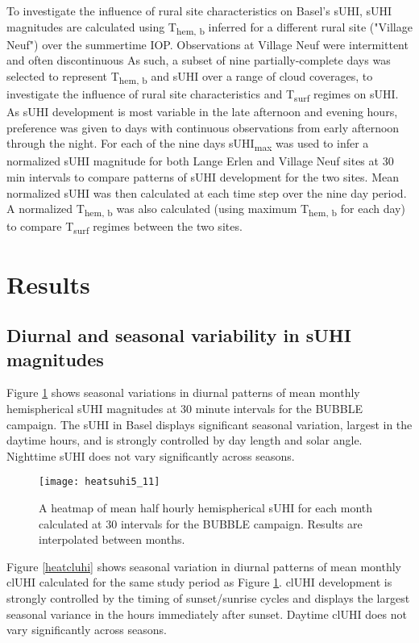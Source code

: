 \begin{bibunit}
To investigate the influence of rural site characteristics on Basel's sUHI, sUHI magnitudes are calculated using T\textsubscript{hem, b} inferred for a different rural site ("Village Neuf") over the summertime IOP. Observations at Village Neuf were intermittent and often discontinuous As such, a subset of nine partially-complete days was selected to represent T\textsubscript{hem, b} and sUHI over a range of cloud coverages, to investigate the influence of rural site characteristics and T\textsubscript{surf} regimes on sUHI. As sUHI development is most variable in the late afternoon and evening hours, preference was given to days with continuous observations from early afternoon through the night. For each of the nine days sUHI\textsubscript{max} was used to infer a normalized sUHI magnitude for both Lange Erlen and Village Neuf sites at 30 \si{\minute} intervals to compare patterns of sUHI development for the two sites. Mean normalized sUHI was then calculated at each time step over the nine day period. A normalized T\textsubscript{hem, b} was also calculated (using maximum T\textsubscript{hem, b} for each day) to compare T\textsubscript{surf} regimes between the two sites.

\section{Results}

\subsection{Diurnal and seasonal variability in sUHI magnitudes}

Figure \ref{heatsuhi} shows seasonal variations in diurnal patterns of mean monthly hemispherical sUHI magnitudes at 30 minute intervals for the BUBBLE campaign. The sUHI in Basel displays significant seasonal variation, largest in the daytime hours, and is strongly controlled by day length and solar angle. Nighttime sUHI does not vary significantly across seasons. 

\begin{figure}[H]
	\centering
	\texttt{[image: heatsuhi5\_11]}
	\caption{A heatmap of mean half hourly hemispherical sUHI for each month calculated at 30 \si{\min} intervals for the BUBBLE campaign. Results are interpolated between months.}
	\label{heatsuhi}
\end{figure}

Figure \ref{heatcluhi} shows seasonal variation in diurnal patterns of mean monthly clUHI calculated for the same study period as Figure \ref{heatsuhi}. clUHI development is strongly controlled by the timing of sunset/sunrise cycles and displays the largest seasonal variance in the hours immediately after sunset. Daytime clUHI does not vary significantly across seasons. 


\end{bibunit}
